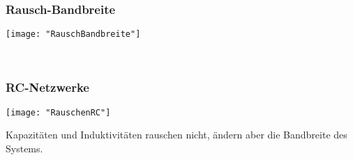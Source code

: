 \subsubsection{Rausch-Bandbreite}
\begin{minipage}[t]{0.3\textwidth}
	\vspace{0pt}
	\texttt{[image: "RauschBandbreite"]}
\end{minipage}\hspace{0.05\textwidth}
\begin{minipage}[t]{0.3\textwidth}
	\vspace{0pt}
\end{minipage}\hspace{0.05\textwidth}
\begin{minipage}[t]{0.3\textwidth}
	\\
\end{minipage}
\vspace{2mm}


\subsubsection{RC-Netzwerke}
\begin{minipage}[t]{0.3\textwidth}
	\vspace{0pt}
	\texttt{[image: "RauschenRC"]}
\end{minipage}\hspace{0.05\textwidth}
\begin{minipage}[t]{0.3\textwidth}
	\vspace{0pt}
	Kapazitäten und Induktivitäten rauschen nicht, ändern aber die Bandbreite des Systems.\\
\end{minipage}\hspace{0.05\textwidth}
\begin{minipage}[t]{0.3\textwidth}
	\\
	\\
	\\
\end{minipage}
\vspace{2mm}


